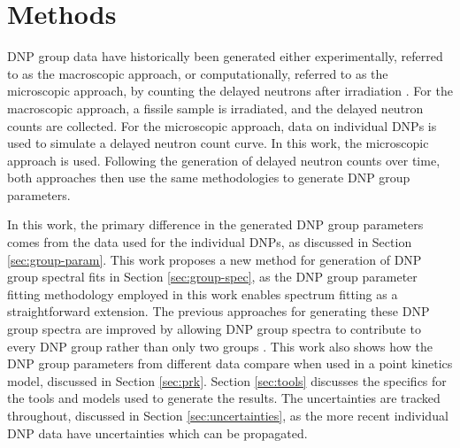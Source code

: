 \documentclass{style/nseJournal}
\begin{document}
\section{Methods}
\label{sec:methods}

DNP group data have historically been generated either experimentally, referred to as the macroscopic approach, or computationally, referred to as the microscopic approach, by counting the delayed neutrons after irradiation \cite{KEEPIN1957IN2, PhysRev.73.111, dnpthesis, doi:10.13182/NSE98-A1955, doi:10.13182/NSE00-A2097, parish1999status, leconte2020new}.
For the macroscopic approach, a fissile sample is irradiated, and the delayed neutron counts are collected.
For the microscopic approach, data on individual DNPs is used to simulate a delayed neutron count curve.
In this work, the microscopic approach is used.
Following the generation of delayed neutron counts over time, both approaches then use the same methodologies to generate DNP group parameters.

In this work, the primary difference in the generated DNP group parameters comes from the data used for the individual DNPs, as discussed in Section \ref{sec:group-param}.
This work proposes a new method for generation of DNP group spectral fits in Section \ref{sec:group-spec}, as the DNP group parameter fitting methodology employed in this work enables spectrum fitting as a straightforward extension.
The previous approaches for generating these DNP group spectra are improved by allowing DNP group spectra to contribute to every DNP group rather than only two groups \cite{doi:10.13182/NSE77-A15209, doi:10.13182/NSE103-129, dnpthesis, doi:10.13182/NSE82-A21428, doi:10.13182/NSE83-A27422}.
This work also shows how the DNP group parameters from different data compare when used in a point kinetics model, discussed in Section \ref{sec:prk}.
Section \ref{sec:tools} discusses the specifics for the tools and models used to generate the results.
The uncertainties are tracked throughout, discussed in Section \ref{sec:uncertainties}, as the more recent individual DNP data have uncertainties which can be propagated.
\end{document}
